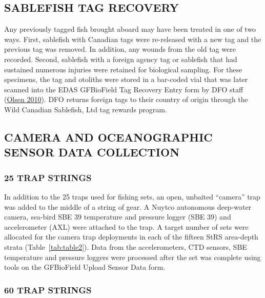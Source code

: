 \documentclass[12pt]{article}\usepackage[]{graphicx}\usepackage[]{color}
\begin{document}
\hypertarget{sablefish-tag-recovery}{%
\subsection{SABLEFISH TAG RECOVERY}\label{sablefish-tag-recovery}}

Any previously tagged fish brought aboard may have been treated in one of two ways. First, sablefish with Canadian tags were re-released with a new tag and the previous tag was removed. In addition, any wounds from the old tag were recorded. Second, sablefish with a foreign agency tag or sablefish that had sustained numerous injuries were retained for biological sampling. For these specimens, the tag and otoliths were stored in a bar-coded vial that was later scanned into the EDAS GFBioField Tag Recovery Entry form by DFO staff (\protect\hyperlink{ref-Olsen2010}{Olsen 2010}). DFO returns foreign tags to their country of origin through the Wild Canadian Sablefish, Ltd tag rewards program.

\hypertarget{camera-and-oceanographic-sensor-data-collection}{%
\subsection{CAMERA AND OCEANOGRAPHIC SENSOR DATA COLLECTION}\label{camera-and-oceanographic-sensor-data-collection}}

\hypertarget{trap-strings}{%
\subsubsection{25 TRAP STRINGS}\label{trap-strings}}

In addition to the 25 traps used for fishing sets, an open, unbaited ``camera'' trap was added to the middle of a string of gear. A Nuytco autonomous deep-water camera, sea-bird SBE 39 temperature and pressure logger (SBE 39) and accelerometer (AXL) were attached to the trap. A target number of sets were allocated for the camera trap deployments in each of the fifteen StRS area-depth strata (Table~\ref{tab:table2}). Data from the accelerometers, CTD sensors, SBE temperature and pressure loggers were processed after the set was complete using tools on the GFBioField Upload Sensor Data form.

\hypertarget{trap-strings-1}{%
\subsubsection{60 TRAP STRINGS}\label{trap-strings-1}}
\end{document}
